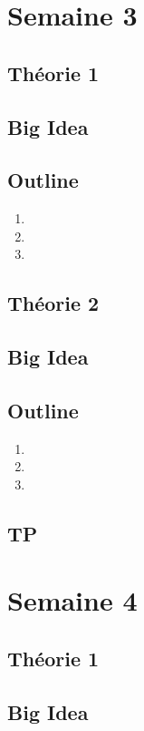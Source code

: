 \documentclass{article}
\begin{document}
\pagebreak
\section{Semaine 3}
\subsection{Théorie 1}
\subsection*{Big Idea}
\subsection*{Outline}
    \begin{enumerate}
    \item
    \item
    \item
    \end{enumerate}
\subsection{Théorie 2}
\subsection*{Big Idea}
\subsection*{Outline}
    \begin{enumerate}
    \item
    \item
    \item
    \end{enumerate}
\subsection{TP}

\pagebreak
\section{Semaine 4}
\subsection{Théorie 1}
\subsection*{Big Idea}
\end{document}
